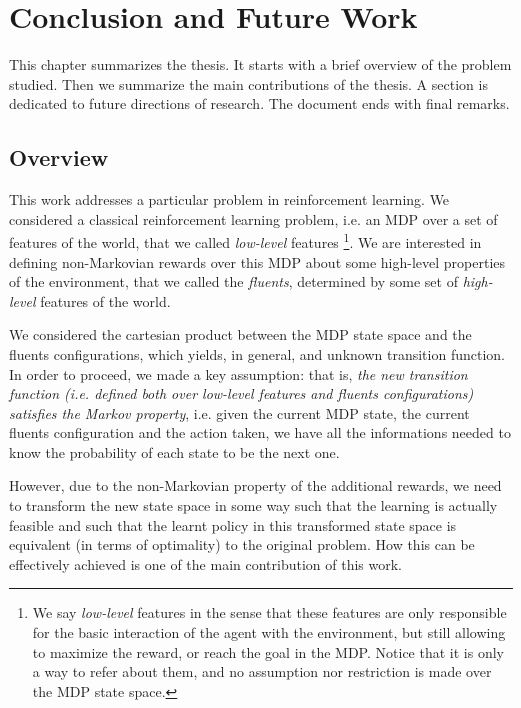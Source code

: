 \chapter{Conclusion and Future Work}\label{ch:conclusions}
This chapter summarizes the thesis. It starts with a brief overview of the problem studied. Then we summarize the main contributions of the thesis. A section is dedicated to future directions of research. The document ends with final remarks.
\section{Overview}
This work addresses a particular problem in reinforcement learning. We considered a classical reinforcement learning problem, i.e. an MDP over a set of features of the world, that we called \emph{low-level} features
\footnote{We say \emph{low-level} features in the sense that these features are only responsible for the basic interaction of the agent with the environment, but still allowing to maximize the reward, or reach the goal in the MDP. Notice that it is only a way to refer about them, and no assumption nor restriction is made over the MDP state space.}.
We are interested in defining non-Markovian rewards over this MDP about some high-level properties of the environment, that we called the \emph{fluents}, determined by some set of \emph{high-level} features of the world.

We considered the cartesian product between the MDP state space and the fluents configurations, which yields, in general, and unknown transition function. 
In order to proceed, we made a key assumption: that is, \emph{the new transition function (i.e. defined both over low-level features and fluents configurations) satisfies the Markov property}, i.e. given the current MDP state, the current fluents configuration and the action taken, we have all the informations needed to know the probability of each state to be the next one.

However, due to the non-Markovian property of the additional rewards, we need to transform the new state space in some way such that the learning is actually feasible and such that the learnt policy in this transformed state space is equivalent (in terms of optimality) to the original problem. How this can be effectively achieved is one of the main contribution of this work.
